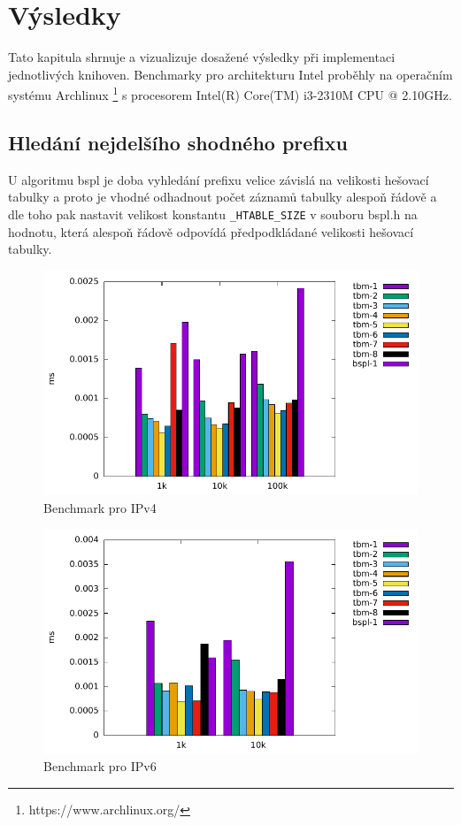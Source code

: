\chapter{Výsledky}\label{chapter:results}
Tato kapitula shrnuje a vizualizuje dosažené výsledky při implementaci jednotlivých knihoven.
Benchmarky pro architekturu Intel proběhly na operačním systému Archlinux \footnote{https://www.archlinux.org/} s procesorem Intel(R) Core(TM) i3-2310M CPU @ 2.10GHz.

\section{Hledání nejdelšího shodného prefixu}
U algoritmu bspl je doba vyhledání prefixu velice závislá na velikosti hešovací tabulky a proto je vhodné odhadnout počet záznamů tabulky alespoň řádově a dle toho pak nastavit velikost konstantu {\tt \_HTABLE\_SIZE} v souboru bspl.h na hodnotu, která alespoň řádově odpovídá předpodkládané velikosti hešovací tabulky.

\begin{figure}[!htb]
	\centering
	\includegraphics[scale=1]{fig/lpm-ipv4.pdf}
	\caption{Benchmark pro IPv4}
\end{figure}\label{fig:lpm-ipv4}

\begin{figure}[!htb]
	\centering
	\includegraphics[scale=1]{fig/lpm-ipv6.pdf}
	\caption{Benchmark pro IPv6}
\end{figure}\label{fig:lpm-ipv4}

